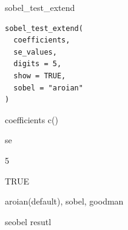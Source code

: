 \documentclass[a4paper]{book}
\begin{document}
%
\begin{Description}
sobel\_test\_extend
\end{Description}
%
\begin{Usage}
\begin{verbatim}
sobel_test_extend(
  coefficients,
  se_values,
  digits = 5,
  show = TRUE,
  sobel = "aroian"
)
\end{verbatim}
\end{Usage}
%
\begin{Arguments}
\begin{ldescription}
\item[\code{coefficients}] coefficients c()

\item[\code{se\_values}] se

\item[\code{digits}] 5

\item[\code{show}] TRUE

\item[\code{sobel}] aroian(default), sobel, goodman
\end{ldescription}
\end{Arguments}
%
\begin{Value}
seobel resutl
\end{Value}
%
\end{document}
